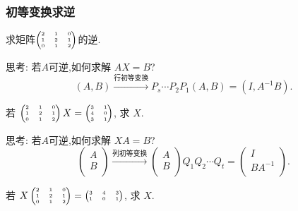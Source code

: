 \begin{frame}\frametitle{初等变换求逆}
\begin{example}
求矩阵$\tiny\begin{pmatrix}2&1&0\\1&2&1\\0&1&2\end{pmatrix}$的逆. \pp \qquad \qquad \qquad  {}
\end{example}
\pp

思考: 若$A$可逆,如何求解 $AX=B$? \pp
\[(A,B)\xrightarrow{\text{行初等变换}} P_s\cdots P_2P_1(A,B)=(I,A^{-1}B).\]
\pp

\begin{example}
若 $\tiny\begin{pmatrix}2&1&0\\1&2&1\\0&1&2\end{pmatrix}X = \begin{pmatrix} 3& 1\\ 4& 0\\ 3& 1\\ \end{pmatrix}$, 求 $X$. \pp \qquad \qquad \qquad   {}
\end{example}

思考: 若$A$可逆,如何求解 $XA=B$? \pp
\[\begin{pmatrix}A\\B\\\end{pmatrix} \xrightarrow{\text{列初等变换}} \begin{pmatrix}A\\B\\\end{pmatrix}Q_1Q_2\cdots Q_t=\begin{pmatrix}I\\BA^{-1}\\\end{pmatrix}.\]
\pp

\begin{example}
若 $\tiny X\begin{pmatrix}2&1&0\\1&2&1\\0&1&2\end{pmatrix} = \begin{pmatrix} 3&4&3\\1&0&1\\\end{pmatrix}$, 求 $X$. \pp \qquad \qquad \qquad   {}
\end{example}


\end{frame}
